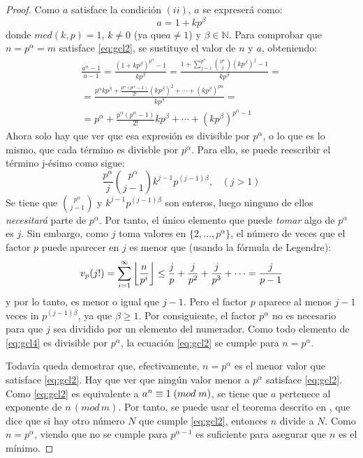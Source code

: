\begin{proof}
Como $a$ satisface la condición $(ii)$, $a$ se expreserá como:
\begin{equation}\label{eq:gcl3}
a=1+kp^\beta
\end{equation}
donde $mcd(k,p)=1$, $k\neq 0$ (ya que$a\neq 1$) y $\beta\in\mathbb{N}$. Para comprobar que $n=p^\alpha=m$ satisface \eqref{eq:gcl2}, se sustituye el valor de $n$ y $a$, obteniendo:
\begin{multline}\label{eq:gcl4}
\frac{a^n-1}{a-1}=\frac{(1+kp^\beta)^{p^\alpha}-1}{kp^\beta}=\frac{1+\sum_{j=1}^{p^\alpha}\binom{p^\alpha}{j}(kp^\beta)^j-1}{kp^\beta}= \\
= \frac{p^\alpha kp^\beta+\frac{p^\alpha(p^\alpha-1)}{2!}(kp^\beta)^2+\cdots+(kp^\beta)^{p\alpha}}{kp^\beta} = \\
=p^\alpha+\frac{p^\alpha(p^\alpha-1)}{2!}kp^\beta+\cdots+(kp^\beta)^{p^\alpha-1}
\end{multline}
Ahora solo hay que ver que esa expresión es divisible por $p^\alpha$, o lo que es lo mismo, que cada término es divisble por $p^\alpha$.  Para ello, se puede reescribir el término j-ésimo como sigue:
\[
\frac{p^\alpha}{j} \binom{p^\alpha}{j-1} k^{j-1}p^{(j-1)\beta}, \;\;\; (j>1)
\]
Se tiene que $\binom{p^\alpha}{j-1}$ y $k^{j-1}p^{(j-1)\beta}$ son enteros, luego ninguno de ellos \textit{necesitará} parte de $p^\alpha$. Por tanto, el único elemento que puede \textit{tomar} algo de $p^\alpha$ es $j$. Sin embargo, como $j$ toma valores en $\{2, \ldots, p^\alpha\}$, el número de veces que el factor $p$ puede aparecer en $j$ es menor que (usando la fórmula de Legendre):
\begin{equation}\label{eq:gcl6}
v_p(j!)=\sum_{i=1}^\infty\left\lfloor\frac{n}{p^i}\right\rfloor\leq\frac{j}{p}+\frac{j}{p^2}+\frac{j}{p^3}+\cdots=\frac{j}{p-1}
\end{equation}
y por lo tanto, es menor o igual que $j-1$. Pero el factor $p$ aparece al menos $j-1$ veces in $p^{(j-1)\beta}$, ya que $\beta\geq 1$. Por consiguiente, el factor $p^\alpha$ no es necesario para que $j$ sea dividido por un elemento del numerador. Como todo elemento de \eqref{eq:gcl4} es divisible por $p^\alpha$, la ecuación \eqref{eq:gcl2} se cumple para $n=p^\alpha$.

Todavía queda demostrar que, efectivamente, $n=p^\alpha$ es el menor valor que satisface \eqref{eq:gcl2}. Hay que ver que ningún valor menor a $p^\alpha$ satisface \eqref{eq:gcl2}. Como \eqref{eq:gcl2} es equivalente a $a^n \equiv 1 \;(mod \; m)$, se tiene que $a$ pertenece al exponente de $n\,(mod\, m)$.  Por tanto, se puede usar el teorema descrito en \cite{ore1988number}, que dice que si hay otro número $N$ que cumple \eqref{eq:gcl2}, entonces $n$ divide a $N$. Como $n=p^\alpha$, viendo que no se cumple para $p^{\alpha-1}$ es suficiente para asegurar que $n$ es el mínimo.


\end{proof}
